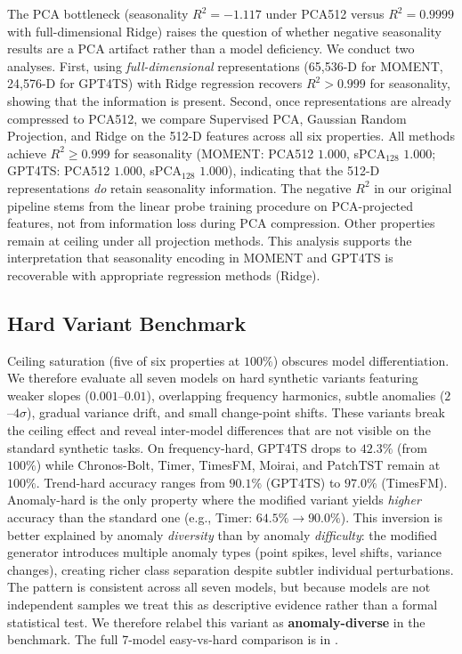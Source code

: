 \documentclass{article}
\begin{document}
The PCA bottleneck (seasonality $R^2 = -1.117$ under PCA512 versus $R^2 = 0.9999$ with full-dimensional Ridge) raises the question of whether negative seasonality results are a PCA artifact rather than a model deficiency. We conduct two analyses. First, using \emph{full-dimensional} representations (65,536-D for MOMENT, 24,576-D for GPT4TS) with Ridge regression recovers $R^2 > 0.999$ for seasonality, showing that the information is present. Second, once representations are already compressed to PCA512, we compare Supervised PCA, Gaussian Random Projection, and Ridge on the 512-D features across all six properties. All methods achieve $R^2 \geq 0.999$ for seasonality (MOMENT: PCA512 $1.000$, sPCA$_{128}$ $1.000$; GPT4TS: PCA512 $1.000$, sPCA$_{128}$ $1.000$), indicating that the 512-D representations \emph{do} retain seasonality information. The negative $R^2$ in our original pipeline stems from the linear probe training procedure on PCA-projected features, not from information loss during PCA compression. Other properties remain at ceiling under all projection methods. This analysis supports the interpretation that seasonality encoding in MOMENT and GPT4TS is recoverable with appropriate regression methods (Ridge).

\subsection{Hard Variant Benchmark}
\label{sec:hard_variants}

Ceiling saturation (five of six properties at $100\%$) obscures model differentiation. We therefore evaluate all seven models on hard synthetic variants featuring weaker slopes ($0.001$--$0.01$), overlapping frequency harmonics, subtle anomalies ($2$--$4\sigma$), gradual variance drift, and small change-point shifts. These variants break the ceiling effect and reveal inter-model differences that are not visible on the standard synthetic tasks. On frequency-hard, GPT4TS drops to $42.3\%$ (from $100\%$) while Chronos-Bolt, Timer, TimesFM, Moirai, and PatchTST remain at $100\%$. Trend-hard accuracy ranges from $90.1\%$ (GPT4TS) to $97.0\%$ (TimesFM). Anomaly-hard is the only property where the modified variant yields \emph{higher} accuracy than the standard one (e.g., Timer: $64.5\% \to 90.0\%$). This inversion is better explained by anomaly \emph{diversity} than by anomaly \emph{difficulty}: the modified generator introduces multiple anomaly types (point spikes, level shifts, variance changes), creating richer class separation despite subtler individual perturbations. The pattern is consistent across all seven models, but because models are not independent samples we treat this as descriptive evidence rather than a formal statistical test. We therefore relabel this variant as \textbf{anomaly-diverse} in the benchmark. The full 7-model easy-vs-hard comparison is in .
\end{document}
